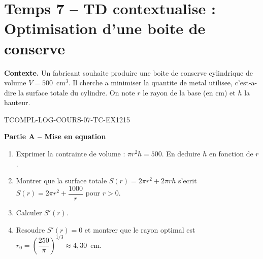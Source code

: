 

\section*{Temps 7 -- TD contextualise : Optimisation d'une boite de conserve}

\textbf{Contexte.} Un fabricant souhaite produire une boite de conserve cylindrique de volume $V = 500$~cm$^3$. Il cherche a minimiser la quantite de metal utilisee, c'est-a-dire la surface totale du cylindre. On note $r$ le rayon de la base (en cm) et $h$ la hauteur.

\bigskip


\begin{exercice}{TCOMPL-LOG-COURS-07-TC-EX1}{2}{15}

\textbf{Partie A -- Mise en equation}

\begin{enumerate}
  \item Exprimer la contrainte de volume : $\pi r^2 h = 500$. En deduire $h$ en fonction de $r$.
  \item Montrer que la surface totale $S(r) = 2\pi r^2 + 2\pi r h$ s'ecrit $S(r) = 2\pi r^2 + \dfrac{1000}{r}$ pour $r > 0$.
  \item Calculer $S'(r)$.
  \item Resoudre $S'(r) = 0$ et montrer que le rayon optimal est $r_0 = \left(\dfrac{250}{\pi}\right)^{1/3} \approx 4{,}30$~cm.
\end{enumerate}

\end{exercice}

